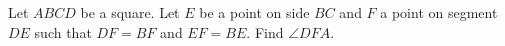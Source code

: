 Let $ABCD$ be a square. Let $E$ be a point on side $BC$ and $F$ a point on segment $DE$ such that $DF=BF$ and $EF=BE$. Find $\angle DFA$.
